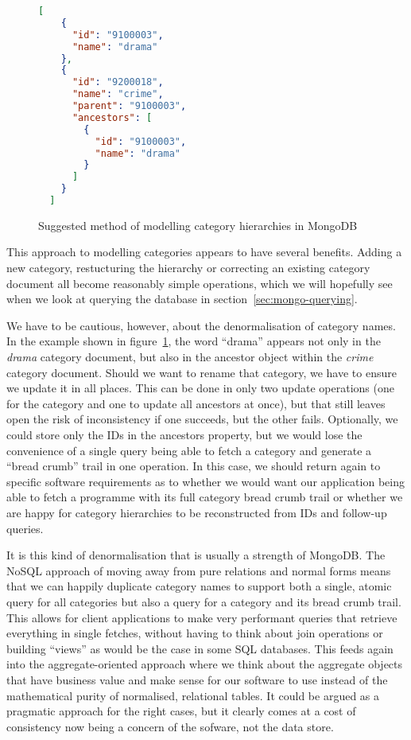 \documentclass[11pt,a4paper]{article}
\begin{document}
\begin{figure}[p]
\begin{lstlisting}[language=json]
  [
    {
      "id": "9100003",
      "name": "drama"
    },
    {
      "id": "9200018",
      "name": "crime",
      "parent": "9100003",
      "ancestors": [
        {
          "id": "9100003",
          "name": "drama"
        }
      ]
    }
  ]
\end{lstlisting}
  \caption{Suggested method of modelling category hierarchies in MongoDB}
  \label{fig:json-categories}
\end{figure}

This approach to modelling categories appears to have several benefits.
Adding a new category, restucturing the hierarchy or correcting an
existing category document all become reasonably simple operations, which
we will hopefully see when we look at querying the database in
section~\ref{sec:mongo-querying}.

We have to be cautious, however, about the denormalisation of category
names. In the example shown in figure~\ref{fig:json-categories}, the
word ``drama'' appears not only in the \emph{drama} category document, but
also in the ancestor object within the \emph{crime} category document.
Should we want to rename that category, we have to ensure we update it
in all places. This can be done in only two update operations (one
for the category and one to update all ancestors at once), but
that still leaves open the risk of inconsistency if one succeeds, but
the other fails. Optionally, we could store only the IDs in the
ancestors property, but we would lose the convenience of a single
query being able to fetch a category and generate a ``bread crumb''
trail in one operation. In this case, we should return again
to specific software requirements as to whether we would want
our application being able to fetch a programme with its full category
bread crumb trail or whether we are happy for category hierarchies to
be reconstructed from IDs and follow-up queries.

It is this kind of denormalisation that is usually a strength of MongoDB.
The NoSQL approach of moving away from pure relations and normal forms
means that we can happily duplicate category names to support
both a single, atomic query for all categories but also a query
for a category and its bread crumb trail. This allows for client
applications to make very performant queries that retrieve everything
in single fetches, without having to think about join operations
or building ``views'' as would be the case in some SQL databases. This
feeds again into the aggregate-oriented approach where we think about
the aggregate objects that have business value and make sense for our
software to use instead of the mathematical purity of normalised,
relational tables. It could be argued as a pragmatic approach for
the right cases, but it clearly comes at a cost of consistency now
being a concern of the sofware, not the data store.
\end{document}
